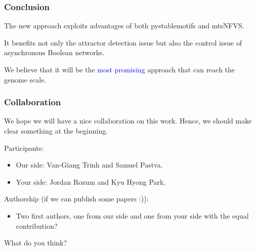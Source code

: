\documentclass{beamer}              %
\newcommand{\blue}[1]{\textcolor{blue}{#1}}
\begin{document}
\begin{frame}
\frametitle{Conclusion}

The new approach exploits advantages of both pystablemotifs and mtsNFVS.

\hspace{0.8cm}

It benefits not only the attractor detection issue but also the control issue of asynchronous Boolean networks.

\hspace{0.8cm}

We believe that it will be the \blue{most promising} approach that can reach the genome scale.

\end{frame}

\begin{frame}
\frametitle{Collaboration}

We hope we will have a nice collaboration on this work.
Hence, we should make clear something at the beginning.

\hspace{0.8cm}

Participants:
\begin{itemize}
  \item Our side: Van-Giang Trinh and Samuel Pastva.
  \item Your side: Jordan Rozum and Kyu Hyong Park.
\end{itemize}

\hspace{0.8cm}

Authorship (if we can publish some papers :)): 
\begin{itemize}
  \item Two first authors, one from our side and one from your side with the equal contribution?
\end{itemize}

\hspace{0.8cm}

What do you think?

\end{frame}
\end{document}
